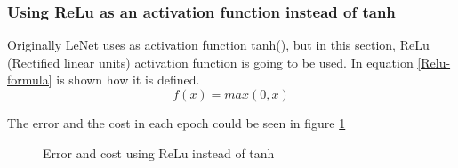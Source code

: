 \subsubsection{Using ReLu as an activation function instead of tanh}
Originally LeNet uses as activation function tanh(), but in this section, ReLu (Rectified linear units) activation function is going to be used. In equation \ref{Relu-formula} is shown how it is defined.  \\

\begin{equation}
f(x) = max(0,x)
\label{Relu-formula}
\end{equation}

The error and the cost in each epoch could be seen in figure \ref{fig:LENET_relu}

\begin{figure}[htb]
\centering

\caption{Error and cost using ReLu instead of tanh}
\label{fig:LENET_relu}
\end{figure}


